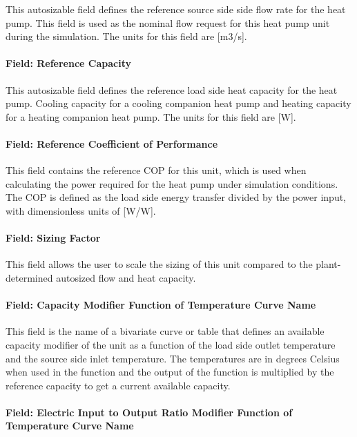 This autosizable field defines the reference source side side flow rate for the heat pump. This field is used as the nominal flow request for this heat pump unit during the simulation. The units for this field are [m3/s].

\paragraph{Field: Reference Capacity}\label{plhp_eir_inputs_reference_capacity}

This autosizable field defines the reference load side heat capacity for the heat pump. Cooling capacity for a cooling companion heat pump and heating capacity for a heating companion heat pump. The units for this field are [W].

\paragraph{Field: Reference Coefficient of Performance}\label{plhp_eir_inputs_reference_cop}

This field contains the reference COP for this unit, which is used when calculating the power required for the heat pump under simulation conditions. The COP is defined as the load side energy transfer divided by the power input, with dimensionless units of [W/W].

\paragraph{Field: Sizing Factor}\label{plhp_eir_inputs_sizing_factor}

This field allows the user to scale the sizing of this unit compared to the plant-determined autosized flow and heat capacity.

\paragraph{Field: Capacity Modifier Function of Temperature Curve Name}\label{plhp_eir_inputs_capft}

This field is the name of a bivariate curve or table that defines an available capacity modifier of the unit as a function of the load side outlet temperature and the source side inlet temperature. The temperatures are in degrees Celsius when used in the function and the output of the function is multiplied by the reference capacity to get a current available capacity.

\paragraph{Field: Electric Input to Output Ratio Modifier Function of Temperature Curve Name}\label{plhp_eir_inputs_eirft}

